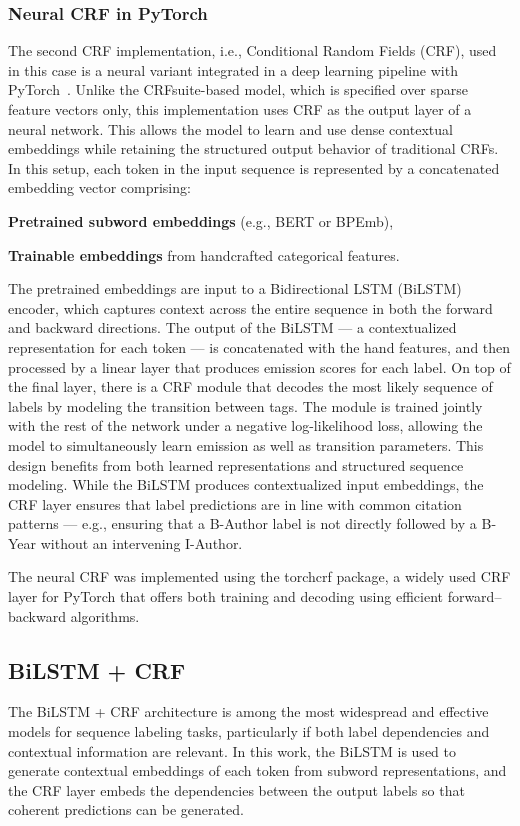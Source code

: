 \subsubsection{Neural CRF in PyTorch}
The second CRF implementation, i.e., Conditional Random Fields (CRF), used in this case is a neural variant integrated in a deep learning pipeline with PyTorch~\cite{torchcrf}. Unlike the CRFsuite-based model, which is specified over sparse feature vectors only, this implementation uses CRF as the output layer of a neural network. This allows the model to learn and use dense contextual embeddings while retaining the structured output behavior of traditional CRFs.
In this setup, each token in the input sequence is represented by a concatenated embedding vector comprising:
\begin{compactitem}
\item \textbf{Pretrained subword embeddings} (e.g., BERT or BPEmb),
\item \textbf{Trainable embeddings} from handcrafted categorical features.
\end{compactitem}
The pretrained embeddings are input to a Bidirectional LSTM (BiLSTM) encoder, which captures context across the entire sequence in both the forward and backward directions. The output of the BiLSTM — a contextualized representation for each token — is concatenated with the hand features, and then processed by a linear layer that produces emission scores for each label.
On top of the final layer, there is a CRF module that decodes the most likely sequence of labels by modeling the transition between tags. The module is trained jointly with the rest of the network under a negative log-likelihood loss, allowing the model to simultaneously learn emission as well as transition parameters.
This design benefits from both learned representations and structured sequence modeling. While the BiLSTM produces contextualized input embeddings, the CRF layer ensures that label predictions are in line with common citation patterns — e.g., ensuring that a B-Author label is not directly followed by a B-Year without an intervening I-Author.

The neural CRF was implemented using the torchcrf package, a widely used CRF layer for PyTorch that offers both training and decoding using efficient forward–backward algorithms.

\subsection{BiLSTM + CRF}
The BiLSTM + CRF architecture is among the most widespread and effective models for sequence labeling tasks, particularly if both label dependencies and contextual information are relevant. In this work, the BiLSTM is used to generate contextual embeddings of each token from subword representations, and the CRF layer embeds the dependencies between the output labels so that coherent predictions can be generated.

